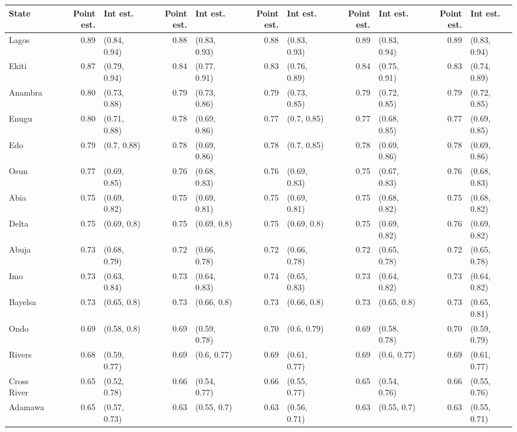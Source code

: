 
\begin{tabular}{lrlrlrlrlrl}
\toprule
State & Point est. & Int est. & Point est. & Int est. & Point est. & Int est. & Point est. & Int est. & Point est. & Int est.\\
\midrule
Lagos & 0.89 & (0.84, 0.94) & 0.88 & (0.83, 0.93) & 0.88 & (0.83, 0.93) & 0.89 & (0.83, 0.94) & 0.89 & (0.83, 0.94)\\
Ekiti & 0.87 & (0.79, 0.94) & 0.84 & (0.77, 0.91) & 0.83 & (0.76, 0.89) & 0.84 & (0.75, 0.91) & 0.83 & (0.74, 0.89)\\
Anambra & 0.80 & (0.73, 0.88) & 0.79 & (0.73, 0.86) & 0.79 & (0.73, 0.85) & 0.79 & (0.72, 0.85) & 0.79 & (0.72, 0.85)\\
Enugu & 0.80 & (0.71, 0.88) & 0.78 & (0.69, 0.86) & 0.77 & (0.7, 0.85) & 0.77 & (0.68, 0.85) & 0.77 & (0.69, 0.85)\\
Edo & 0.79 & (0.7, 0.88) & 0.78 & (0.69, 0.86) & 0.78 & (0.7, 0.85) & 0.78 & (0.69, 0.86) & 0.78 & (0.69, 0.86)\\
Osun & 0.77 & (0.69, 0.85) & 0.76 & (0.68, 0.83) & 0.76 & (0.69, 0.83) & 0.75 & (0.67, 0.83) & 0.76 & (0.68, 0.83)\\
Abia & 0.75 & (0.69, 0.82) & 0.75 & (0.69, 0.81) & 0.75 & (0.69, 0.81) & 0.75 & (0.68, 0.82) & 0.75 & (0.68, 0.82)\\
Delta & 0.75 & (0.69, 0.8) & 0.75 & (0.69, 0.8) & 0.75 & (0.69, 0.8) & 0.75 & (0.69, 0.82) & 0.76 & (0.69, 0.82)\\
Abuja & 0.73 & (0.68, 0.79) & 0.72 & (0.66, 0.78) & 0.72 & (0.66, 0.78) & 0.72 & (0.65, 0.78) & 0.72 & (0.65, 0.78)\\
Imo & 0.73 & (0.63, 0.84) & 0.73 & (0.64, 0.83) & 0.74 & (0.65, 0.83) & 0.73 & (0.64, 0.82) & 0.73 & (0.64, 0.82)\\
Bayelsa & 0.73 & (0.65, 0.8) & 0.73 & (0.66, 0.8) & 0.73 & (0.66, 0.8) & 0.73 & (0.65, 0.8) & 0.73 & (0.65, 0.81)\\
Ondo & 0.69 & (0.58, 0.8) & 0.69 & (0.59, 0.78) & 0.70 & (0.6, 0.79) & 0.69 & (0.58, 0.78) & 0.70 & (0.59, 0.79)\\
Rivers & 0.68 & (0.59, 0.77) & 0.69 & (0.6, 0.77) & 0.69 & (0.61, 0.77) & 0.69 & (0.6, 0.77) & 0.69 & (0.61, 0.77)\\
Cross River & 0.65 & (0.52, 0.78) & 0.66 & (0.54, 0.77) & 0.66 & (0.55, 0.77) & 0.65 & (0.54, 0.76) & 0.66 & (0.55, 0.76)\\
Adamawa & 0.65 & (0.57, 0.73) & 0.63 & (0.55, 0.7) & 0.63 & (0.56, 0.71) & 0.63 & (0.55, 0.7) & 0.63 & (0.55, 0.71)\\

\end{tabular}
